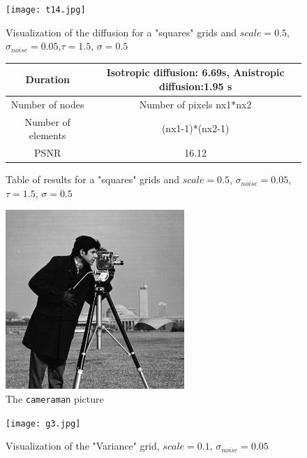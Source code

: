 \documentclass{report}
\begin{document}
        \begin{figure}
        	\label{t14}
        	\centering
        	\caption{Visualization of the diffusion for a "squares" grids and $scale=0.5$, $\sigma_{noise}=0.05$,$\tau=1.5$, $\sigma=0.5$ }
        	\texttt{[image: t14.jpg]}
        \end{figure}
        
        
        
        \begin{figure}
        	\centering
        	\caption{Table of results for a "squares" grids and $scale=0.5$, $\sigma_{noise}=0.05$,$\tau=1.5$, $\sigma=0.5$ }
        	\label{T14}
        	\begin{tabular}{|c|c|}
        		\hline
        		Duration &  
        		Isotropic diffusion: 6.69s,
        		Anistropic diffusion:1.95 s   \\
        		\hline
        		Number of nodes & Number of pixels nx1*nx2 \\
        		\hline
        		Number of elements & (nx1-1)*(nx2-1)\\
        		\hline
        		PSNR & 16.12 \\
        		\hline
        	\end{tabular}
        \end{figure}

\begin{figure} \label{cameraman}
	\centering
	\includegraphics{cameraman.jpg}
	\caption{The \texttt{cameraman} picture}
\end{figure}

\clearpage

\begin{figure}
	\label{g3}
	\centering
	\caption{Visualization of the "Variance" grid, $scale=0.1$, $\sigma_{noise}=0.05$}
	\texttt{[image: g3.jpg]}
\end{figure}
\end{document}
